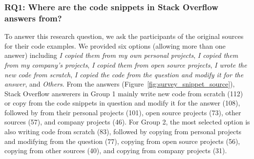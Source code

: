 \documentclass{svjour3}                     %
\begin{document}
\subsubsection*{RQ1: Where are the code snippets in Stack Overflow answers from?} 

To answer this research question, we ask the participants of the original
sources for their code examples. We provided six options (allowing more than one answer)
including \textit{I copied them from my own personal projects}, \textit{I copied
	them from my company's projects}, \textit{I copied them from open source
	projects}, \textit{I wrote the new code from scratch}, \textit{I copied the code
	from the question and modify it for the answer}, and \textit{Others}. From the
answers (Figure~\ref{fig:survey_snippet_source}), Stack Overflow answerers
in Group 1 mainly write new code from scratch (112) or copy from the code snippets in question
and modify it for the answer (108), followed by from their personal
projects (101), open source projects (73), other sources (57), and company projects (46). 
For Group 2, the most selected option is also writing code from scratch (83), followed by copying
from personal projects and modifying from the question (77), copying from open source projects (56),
copying from other sources (40), and copying from company projects (31).
\end{document}
